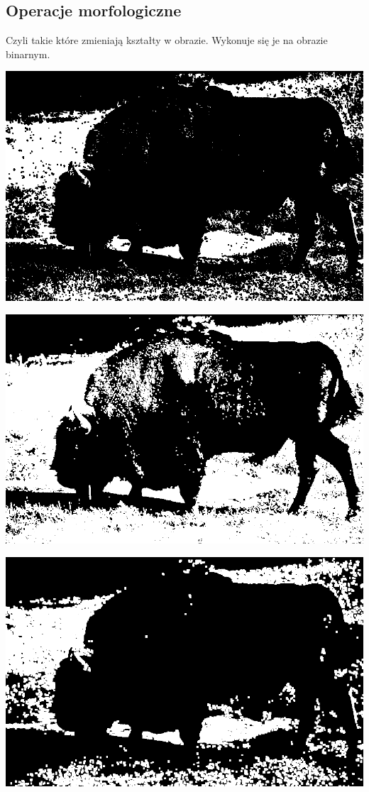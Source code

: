 \documentclass{article}
\begin{document}
	\subsection{Operacje morfologiczne}
	Czyli takie które zmieniają kształty w obrazie. Wykonuje się je na obrazie binarnym.
	\begin{center}
		\includegraphics[width=\linewidth]{../../lab03/bison_erode.png}
	\end{center}
	\begin{center}
		\includegraphics[width=\linewidth]{../../lab03/bison_dilate.png}
	\end{center}
	\begin{center}
		\includegraphics[width=\linewidth]{../../lab03/bison_open.png}
	\end{center}
\end{document}
